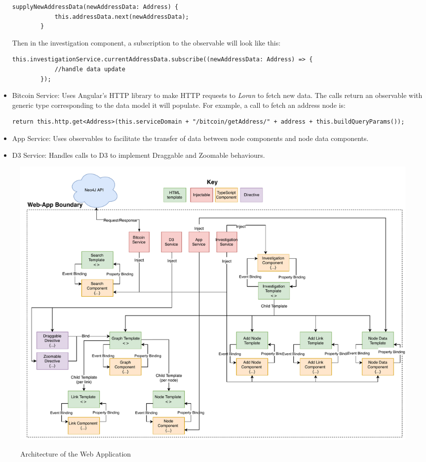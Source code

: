 \begin{itemize}
\begin{lstlisting}[breaklines=true, basicstyle=\small]
        supplyNewAddressData(newAddressData: Address) {
            this.addressData.next(newAddressData);
        }
    \end{lstlisting}
    Then in the investigation component, a subscription to the observable will look like this:
    \begin{lstlisting}[breaklines=true, basicstyle=\small]
        this.investigationService.currentAddressData.subscribe((newAddressData: Address) => {
            //handle data update
        });
    \end{lstlisting}
    \item Bitcoin Service: Uses Angular's HTTP library to make HTTP requests to \textit{Loran} to fetch new data. The calls return an observable with generic type corresponding to the data model it will populate. For example, a call to fetch an address node is:
    \begin{lstlisting}[breaklines=true, basicstyle=\small]
        return this.http.get<Address>(this.serviceDomain + "/bitcoin/getAddress/" + address + this.buildQueryParams()); 
    \end{lstlisting}
    \item App Service: Uses observables to facilitate the transfer of data between node components and node data components. 
    \item D3 Service: Handles calls to D3 to implement Draggable and Zoomable behaviours. 
\end{itemize}

\begin{figure}
  \centering
  \includegraphics[width = 22cm]{./figures/angular-architecture.pdf}\\[0.5cm]
  \caption{Architecture of the Web Application}
  \label{fig:webapp-architecture}
\end{figure}

